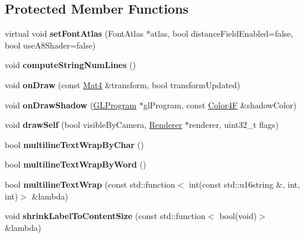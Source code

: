 \subsection*{Protected Member Functions}
\begin{DoxyCompactItemize}
\item 
\mbox{\label{classLabel_aca744a9bdac3e0b6a3a97aaff059a612}} 
virtual void {\bfseries set\+Font\+Atlas} (Font\+Atlas $\ast$atlas, bool distance\+Field\+Enabled=false, bool use\+A8\+Shader=false)
\item 
\mbox{\label{classLabel_af513e8218b4b1c925ad1535dcf7bbb43}} 
void {\bfseries compute\+String\+Num\+Lines} ()
\item 
\mbox{\label{classLabel_a330e5f6af913a07491ca3387b42f1745}} 
void {\bfseries on\+Draw} (const \hyperlink{classMat4}{Mat4} \&transform, bool transform\+Updated)
\item 
\mbox{\label{classLabel_af364c295c196c5918b95e150f1b417da}} 
void {\bfseries on\+Draw\+Shadow} (\hyperlink{classGLProgram}{G\+L\+Program} $\ast$gl\+Program, const \hyperlink{structColor4F}{Color4F} \&shadow\+Color)
\item 
\mbox{\label{classLabel_a915ef0f16a9b4629945407e2e4b70e34}} 
void {\bfseries draw\+Self} (bool visible\+By\+Camera, \hyperlink{classRenderer}{Renderer} $\ast$renderer, uint32\+\_\+t flags)
\item 
\mbox{\label{classLabel_ae64e6940255c20823d7ea693ef0642a5}} 
bool {\bfseries multiline\+Text\+Wrap\+By\+Char} ()
\item 
\mbox{\label{classLabel_a1b74f22307fb323571b8d18f504f8bf6}} 
bool {\bfseries multiline\+Text\+Wrap\+By\+Word} ()
\item 
\mbox{\label{classLabel_a9f6121e9c10c36c84f00f40e297872a7}} 
bool {\bfseries multiline\+Text\+Wrap} (const std\+::function$<$ int(const std\+::u16string \&, int, int)$>$ \&lambda)
\item 
\mbox{\label{classLabel_aac6fdbe568c6231f7d3dfbc177aa15f2}} 
void {\bfseries shrink\+Label\+To\+Content\+Size} (const std\+::function$<$ bool(void)$>$ \&lambda)

\end{DoxyCompactItemize}
